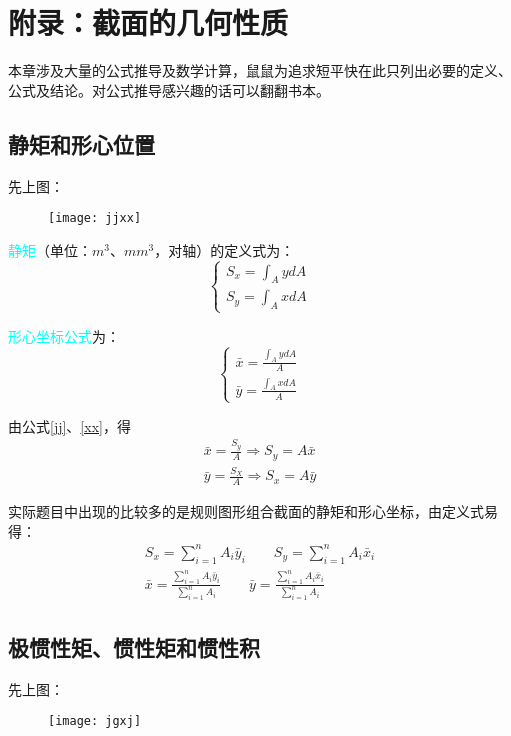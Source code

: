 \documentclass[10pt,a4paper]{ctexart}
\begin{document}
\section{附录\uppercase\expandafter{}：截面的几何性质}
本章涉及大量的公式推导及数学计算，鼠鼠为追求短平快在此只列出必要的定义、公式及结论。对公式推导感兴趣的话可以翻翻书本。

\subsection{静矩和形心位置}
先上图：
\begin{figure}[htp]%
	\centering
	\texttt{[image: jjxx]}
\end{figure}

\textcolor{cyan}{静矩}（单位：$m^3$、$mm^3$，对轴）的定义式为：
\begin{equation}
	\begin{cases}
		S_x=\int_A ydA\\
		S_y=\int_A xdA
	\end{cases}
\label{jj}
\end{equation}

\textcolor{cyan}{形心坐标公式}为：
\begin{equation}
	\begin{cases}
		\bar{x}=\frac{\int_A ydA}{A}\\
		\bar{y}=\frac{\int_A xdA}{A}
	\end{cases}
	\label{xx}
\end{equation}

由公式\ref{jj}、\ref{xx}，得
	\begin{gather}%
	\bar{x}=\frac{S_y}{A} \Rightarrow S_y=A\bar{x}\\	
	\bar{y}=\frac{S_X}{A} \Rightarrow S_x=A\bar{y}
	\end{gather}

实际题目中出现的比较多的是规则图形组合截面的静矩和形心坐标，由定义式易得：
\begin{gather}
	S_x=\sum_{i=1}^n A_i\bar{y}_i \qquad S_y=\sum_{i=1}^n A_i\bar{x}_i\\
	\bar{x}=\frac{\sum\limits_{i=1}^n A_i\bar{y}_i}{\sum\limits_{i=1}^n A_i} \qquad \bar{y}=\frac{\sum\limits_{i=1}^n A_i\bar{x}_i}{\sum\limits_{i=1}^n A_i}
\end{gather}	
		
\subsection{极惯性矩、惯性矩和惯性积}
先上图：
\begin{figure}[htp]%
	\centering
	\texttt{[image: jgxj]}
\end{figure}
\end{document}
